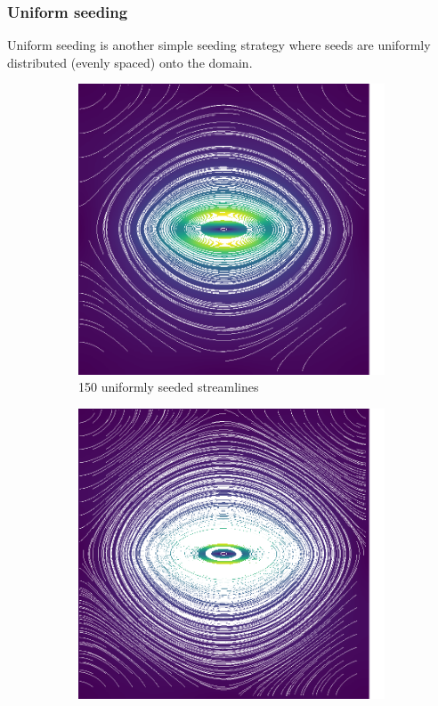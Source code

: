 \documentclass{article}
\begin{document}
\subsubsection{Uniform seeding}
Uniform seeding is another simple seeding strategy where seeds
are uniformly distributed (evenly spaced) onto the domain.

\begin{figure}[h!]
    \centering
    \begin{subfigure}{0.6\textwidth}
        \centering
        \includegraphics[width=\textwidth]{metsim_uniform_150.eps}
        \caption{150 uniformly seeded streamlines}
    \end{subfigure}
    \hfill
    \hfill
    \begin{subfigure}{0.6\textwidth}
        \centering
        \includegraphics[width=\textwidth]{metsim_uniform_500.eps}

\end{subfigure}
\end{figure}
\end{document}
